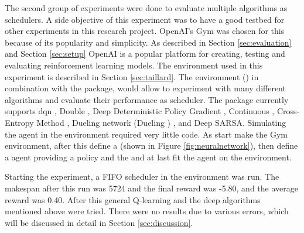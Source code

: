 The second group of experiments were done to evaluate multiple \rl algorithms
as schedulers. A side objective of this experiment was to have a good testbed
for other experiments in this research project. OpenAI's Gym was chosen for
this because of its popularity and simplicity. As described in Section
\ref{sec:evaluation} and Section \ref{sec:setup} OpenAI is a popular platform
for creating, testing and evaluating reinforcement learning models. The
environment used in this experiment is described in Section
\ref{sec:taillard}. The \jss environment () in combination with
the  package, would allow
to experiment with many different \rl algorithms and evaluate their
performance as scheduler. The  package currently supports
\acrfull{dqn} \cite{mnih2013}, Double \dqn \cite{hasselt2016}, Deep
Deterministic Policy Gradient \cite{lillicrap2015}, Continuous \dqn
\cite{gu2016}, Cross-Entropy Method \cite{szita2006}, Dueling network \dqn
(Dueling \dqn) \cite{wang2016}, and Deep SARSA. Simulating the agent in the
\jss environment required very little code. As start make the Gym environment,
after this define a \nn (shown in Figure \ref{fig:neuralnetwork}),
then define a \rl agent providing a policy and the \nn and at last fit the
agent on the environment.



Starting the experiment, a FIFO scheduler in the environment was run. The
makespan after this run was 5724 and the final reward was -5.80, and the
average reward was 0.40. After this general Q-learning and the deep \rl
algorithms mentioned above were tried. There were no results due to various
errors, which will be discussed in detail in Section \ref{sec:discussion}.
